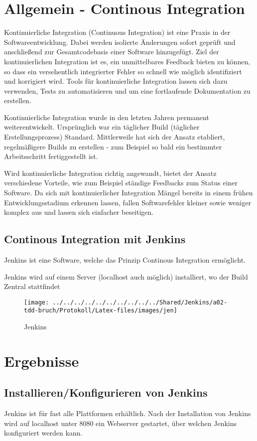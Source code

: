 \section{Allgemein - Continous Integration}
Kontinuierliche Integration (Continuous Integration) ist eine Praxis in der Softwareentwicklung. Dabei werden isolierte Änderungen sofort geprüft und anschließend zur Gesamtcodebasis einer Software hinzugefügt. Ziel der kontinuierlichen Integration ist es, ein unmittelbares Feedback bieten zu können, so dass ein versehentlich integrierter Fehler so schnell wie möglich identifiziert und korrigiert wird. Tools für kontinuierliche Integration lassen sich dazu verwenden, Tests zu automatisieren und um eine fortlaufende Dokumentation zu erstellen.

Kontinuierliche Integration wurde in den letzten Jahren permanent weiterentwickelt. Ursprünglich war ein täglicher Build (täglicher Erstellungsprozess) Standard. Mittlerweile hat sich der Ansatz etabliert, regelmäßigere Builds zu erstellen - zum Beispiel so bald ein bestimmter Arbeitsschritt fertiggestellt ist.

Wird kontinuierliche Integration richtig angewandt, bietet der Ansatz verschiedene Vorteile, wie zum Beispiel ständige Feedbacks zum Status einer Software. Da sich mit kontinuierlicher Integration Mängel bereits in einem frühen Entwicklungsstadium erkennen lassen, fallen Softwarefehler kleiner sowie weniger komplex aus und lassen sich einfacher beseitigen.

\subsection{Continous Integration mit Jenkins}
Jenkins ist eine Software, welche das Prinzip Continous Integration ermöglicht.

Jenkins wird auf einem Server (localhost auch möglich) installiert, wo der Build Zentral stattfindet
\begin{figure}[!h]
\centering
\texttt{[image: ../../../../../../../../../../Shared/Jenkins/a02-tdd-bruch/Protokoll/Latex-files/images/jen]}
\caption{Jenkins}
\label{fig:jen}
\end{figure}

\clearpage

\section{Ergebnisse}
\subsection{Installieren/Konfigurieren von Jenkins}
Jenkins ist für fast alle Plattformen erhältlich. Nach der Installation von Jenkins wird auf localhost unter 8080 ein Webserver gestartet, über welchen Jenkins konfiguriert werden kann.

